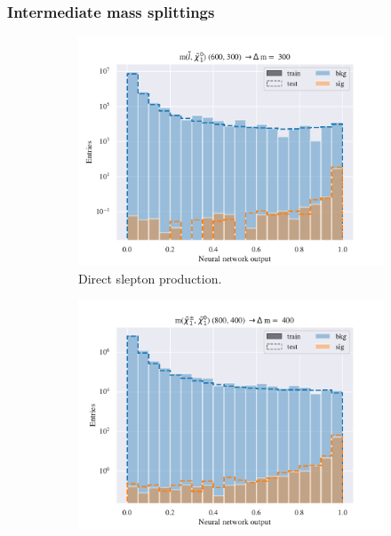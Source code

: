 \subsubsection{Intermediate mass splittings}



\begin{figure}[H]
    \centering
    \begin{subfigure}[t!]{0.49\textwidth}
        \includegraphics[width = \textwidth]{Figures/SlepSlep/ML/NN/Low_level/Inter/scaled_train_test_396014.pdf}
        \caption{Direct slepton production.}
        \label{fig:SlepslepNNLow}
    \end{subfigure}
    \begin{subfigure}[t!]{0.49\textwidth}
        \includegraphics[width = \textwidth]{Figures/SlepSnu/NN/Low_level/Inter/scaled_train_test_397150.pdf}

\end{subfigure}
\end{figure}

